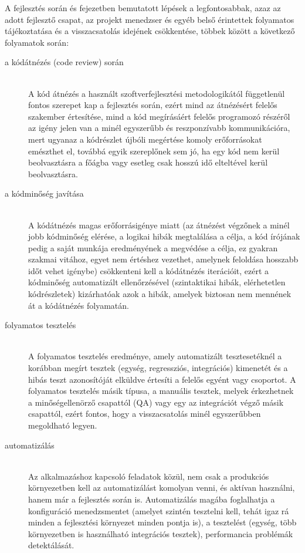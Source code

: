 A fejlesztés során  és  fejezetben bemutatott lépések a legfontosabbak, azaz az adott fejlesztő csapat, az projekt menedzser és egyéb belső érintettek folyamatos tájékoztatása és a visszacsatolás idejének csökkentése, többek között a következő folyamatok során:
\begin{description}
  \item[a kódátnézés (code review) során]\hfill\\
  A kód átnézés a használt szoftverfejlesztési metodologikától függetlenül fontos szerepet kap a fejlesztés során, ezért mind az átnézésért felelős szakember értesítése, mind a kód megírásáért felelős programozó részéről az igény jelen van a minél egyszerűbb és reszponzívabb kommunikációra, mert ugyanaz a kódrészlet újbóli megértése komoly erőforrásokat emészthet el, továbbá egyik szereplőnek sem jó, ha egy kód nem kerül beolvasztásra a főágba vagy esetleg csak hosszú idő elteltével kerül beolvasztásra.
  \item[a kódminőség javítása]\hfill\\
  A kódátnézés magas erőforrásigénye miatt (az átnézést végzőnek a minél jobb kódminőség elérése, a logikai hibák megtalálása a célja, a kód írójának pedig a saját munkája eredményének a megvédése a célja, ez gyakran szakmai vitához, egyet nem értéshez vezethet, amelynek feloldása hosszabb időt vehet igénybe) csökkenteni kell a kódátnézés iterációit, ezért a kódminőség automatizált ellenőrzésével (szintaktikai hibák, elérhetetlen kódrészletek) kizárhatóak azok a hibák, amelyek biztosan nem mennének át a kódátnézés folyamatán.
  \item[folyamatos tesztelés]\hfill\\
  A folyamatos tesztelés eredménye, amely automatizált tesztesetéknél a korábban megírt tesztek (egység, regressziós, integrációs) kimenetét és a hibás teszt azonosítóját elküldve értesíti a felelős egyént vagy csoportot. A folyamatos tesztelés másik típusa, a manuális tesztek, melyek érkezhetnek a minőségellenörző csapattól (QA) vagy egy az integrációt végző másik csapattól, ezért fontos, hogy a visszacsatolás minél egyszerűbben megoldható legyen.
  \item[automatizálás]\hfill\\
  Az alkalmazáshoz kapcsoló feladatok közül, nem csak a produkciós környezetben kell az automatizálást komolyan venni, és aktívan használni, hanem már a fejlesztés során is. Automatizálás magába foglalhatja a konfiguráció menedzsmentet (amelyet szintén tesztelni kell, tehát igaz rá minden a fejlesztési környezet minden pontja is), a tesztelést (egység, több környezetben is használható integrációs tesztek), performancia problémák detektálását.
\end{description}

